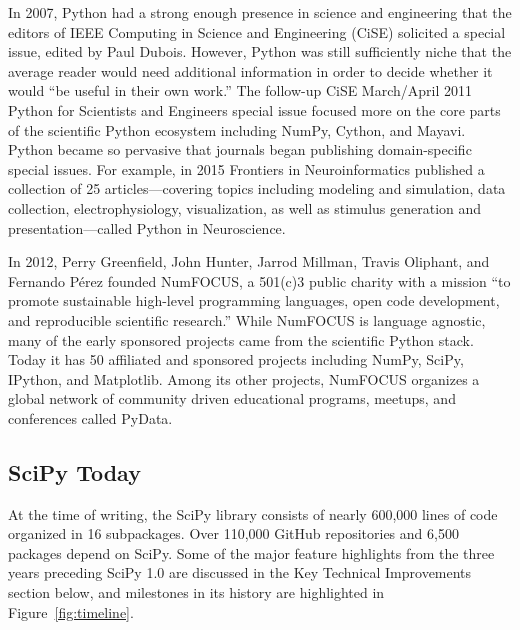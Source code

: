 \documentclass[fleqn,10pt]{wlscirep}
\begin{document}
In 2007, Python had a strong enough presence in science and engineering
that the editors of IEEE Computing in Science and Engineering
(CiSE) solicited a special issue\cite{dubois2007guest}, edited by Paul
Dubois. However, Python was still sufficiently niche that the average reader
would need additional information in order to decide whether it would
``be useful in their own work.''
The follow-up CiSE March/April 2011 Python for Scientists and Engineers
special issue\cite{millman2011python} focused more on the core parts
of the scientific Python ecosystem\cite{perez2011python} including
NumPy\cite{vanderwalt2011numpy}, Cython\cite{behnel2011cython},
and Mayavi\cite{ramachandran2011mayavi}. Python became so pervasive that 
journals began publishing domain-specific special issues.
For example, in 2015 Frontiers in Neuroinformatics published a collection of 25 articles---covering
topics including modeling and simulation, data collection, electrophysiology, visualization,
as well as stimulus generation and presentation---called Python in
Neuroscience\cite{python-FIN}.

In 2012, Perry Greenfield, John Hunter, Jarrod Millman, Travis Oliphant,
and Fernando Pérez founded NumFOCUS\cite{numfocus},
 a 501(c)3 public charity with a mission
``to promote sustainable high-level programming languages, open code development,
and reproducible scientific research.''
While NumFOCUS is language agnostic, many of the early sponsored projects
came from the scientific Python stack.
Today it has 50 affiliated and sponsored projects including NumPy, SciPy, IPython, and
Matplotlib.
Among its other projects, NumFOCUS organizes a global network of 
community driven educational programs, meetups, and conferences
called PyData.

\subsection*{SciPy Today}
At the time of writing, the SciPy library consists of nearly 
600,000 lines of code organized in 16 subpackages. 
Over 110,000 GitHub repositories and 6,500 packages depend
on SciPy\cite{dependents}. Some of the major
feature highlights from the three years preceding
SciPy 1.0 are discussed in the Key Technical Improvements section below,
and milestones in its history are highlighted in Figure~\ref{fig:timeline}.
\end{document}
